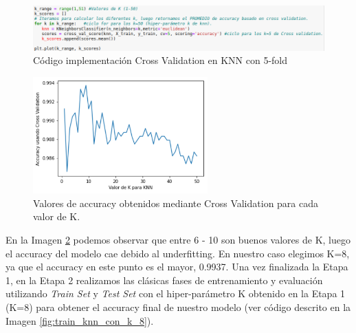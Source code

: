 \documentclass[12pt,a4paper]{article}
\begin{document}
\begin{sloppypar}
\begin{figure}[H]   
\centering
\includegraphics[width=1\textwidth]{images/implementacion_5/cross_val_code.png}
\caption[Código implementación Cross Validation en KNN con 5-fold.]{Código implementación Cross Validation en KNN con 5-fold\protect\footnotemark}
\label{fig:cross_val_code}
\end{figure}


\begin{figure}[H]   
\centering
\includegraphics[width=0.6\textwidth]{images/implementacion_5/Cross_val_accuracy.png}
\captionsetup{justification=centering,margin=2cm}
\caption{Valores de accuracy obtenidos mediante Cross Validation para cada valor de K.}
\label{fig:Cross_val_accuracy}
\end{figure}

En la Imagen \ref{fig:Cross_val_accuracy} podemos observar que entre 6 - 10 son buenos valores de K, luego el accuracy del modelo cae debido al underfitting. En nuestro caso elegimos K=8, ya que el accuracy en este punto es el mayor, 0.9937. 
Una vez finalizada la Etapa 1, en la Etapa 2 realizamos las clásicas fases de entrenamiento y evaluación utilizando \textit{Train Set} y \textit{Test Set} con el hiper-parámetro K obtenido en la Etapa 1 (K=8) para obtener el accuracy final de nuestro modelo (ver código descrito en la Imagen \ref{fig:train_knn_con_k_8}).


\end{sloppypar}
\end{document}
